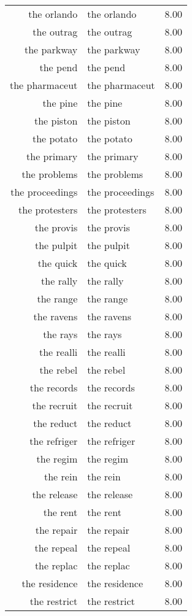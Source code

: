 \begin{table}[ht]
\begin{tabular}{rlr}
  the orlando & the orlando & 8.00 \\ 
  the outrag & the outrag & 8.00 \\ 
  the parkway & the parkway & 8.00 \\ 
  the pend & the pend & 8.00 \\ 
  the pharmaceut & the pharmaceut & 8.00 \\ 
  the pine & the pine & 8.00 \\ 
  the piston & the piston & 8.00 \\ 
  the potato & the potato & 8.00 \\ 
  the primary & the primary & 8.00 \\ 
  the problems & the problems & 8.00 \\ 
  the proceedings & the proceedings & 8.00 \\ 
  the protesters & the protesters & 8.00 \\ 
  the provis & the provis & 8.00 \\ 
  the pulpit & the pulpit & 8.00 \\ 
  the quick & the quick & 8.00 \\ 
  the rally & the rally & 8.00 \\ 
  the range & the range & 8.00 \\ 
  the ravens & the ravens & 8.00 \\ 
  the rays & the rays & 8.00 \\ 
  the realli & the realli & 8.00 \\ 
  the rebel & the rebel & 8.00 \\ 
  the records & the records & 8.00 \\ 
  the recruit & the recruit & 8.00 \\ 
  the reduct & the reduct & 8.00 \\ 
  the refriger & the refriger & 8.00 \\ 
  the regim & the regim & 8.00 \\ 
  the rein & the rein & 8.00 \\ 
  the release & the release & 8.00 \\ 
  the rent & the rent & 8.00 \\ 
  the repair & the repair & 8.00 \\ 
  the repeal & the repeal & 8.00 \\ 
  the replac & the replac & 8.00 \\ 
  the residence & the residence & 8.00 \\ 
  the restrict & the restrict & 8.00 \\ 

\end{tabular}
\end{table}
